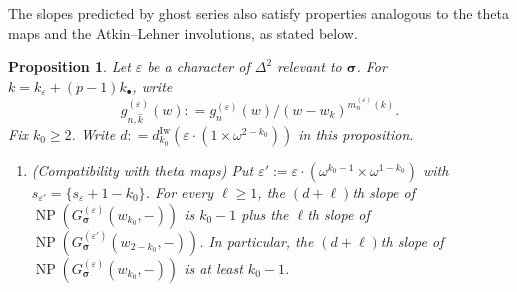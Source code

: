 \documentclass[12pt]{amsart}
\newtheorem{proposition}[subsection]{Proposition}
\theoremstyle{definition}
\numberwithin{equation}{subsection}
\DeclareMathOperator{\NP}{NP}
\newcommand{\bbsigma}{\boldsymbol{\sigma}}
\newcommand{\Iw}{\mathrm{Iw}}
\begin{document}
The slopes predicted by ghost series also satisfy properties analogous to the theta maps and the Atkin--Lehner involutions, as stated below.
\begin{proposition}\label{P:ghost compatible with theta AL and p-stabilization}
Let $\varepsilon$ be a character of $\Delta^2$ relevant to $\bbsigma$.
For $k = k_\varepsilon +(p-1)k_\bullet$,  write 
\begin{equation}
\label{E:gn hat k}
g^{(\varepsilon)}_{n,\hat k}(w): = g_n^{(\varepsilon)}(w) \big/ (w-w_k)^{m_n^{(\varepsilon)}(k)}.
\end{equation}
Fix $k_0 \geq 2$. Write $d: = d_{k_0}^\Iw(\varepsilon\cdot (1\times \omega^{2-k_0}))$ in this proposition.
\begin{enumerate}
\item (Compatibility with theta maps)
Put $\varepsilon' := \varepsilon \cdot (\omega^{k_0-1} \times \omega^{1-k_0})$ with $s_{\varepsilon'} = \{s_\varepsilon +1-k_0\}$. For every $\ell\geq 1$, the $(d+\ell)$th slope of $\NP(G_{\bbsigma}^{(\varepsilon)}(w_{k_0}, -))$ is $k_0-1$ plus the  $\ell$th slope of $\NP(G_{\bbsigma}^{(\varepsilon')}(w_{2-k_0}, -))$. 
In particular, the $(d+\ell)$th slope of $\NP(G_{\bbsigma}^{(\varepsilon)}(w_{k_0}, -))$ is at least ${k_0}-1$.


\end{enumerate}
\end{proposition}
\end{document}
